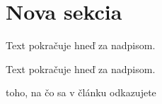 \documentclass[10pt,twoside,slovak,coursepaper]{article}
\begin{document}
\section{Nova sekcia} \label{novasekcia} %


Text pokračuje hneď za nadpisom.


Text pokračuje hneď za nadpisom.





toho, na čo sa v článku odkazujete

\end{document}
